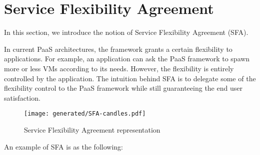 \section{Service Flexibility Agreement}
\label{sec:sfa}

In this section, we introduce the notion of Service Flexibility Agreement (SFA). 

In current PaaS architectures, the framework grants a certain flexibility to applications.
For example, an application can ask the PaaS framework to spawn more or less VMs according to its needs.
However, the flexibility is entirely controlled by the application.
The intuition behind SFA is to delegate some of the flexibility control to the PaaS framework while still guaranteeing the end user satisfaction.






 

\begin{figure}[h]
\centering
\texttt{[image: generated/SFA-candles.pdf]}
\caption{Service Flexibility Agreement representation}
\label{fig:EASC}
\end{figure}

An example of SFA is as the following:

